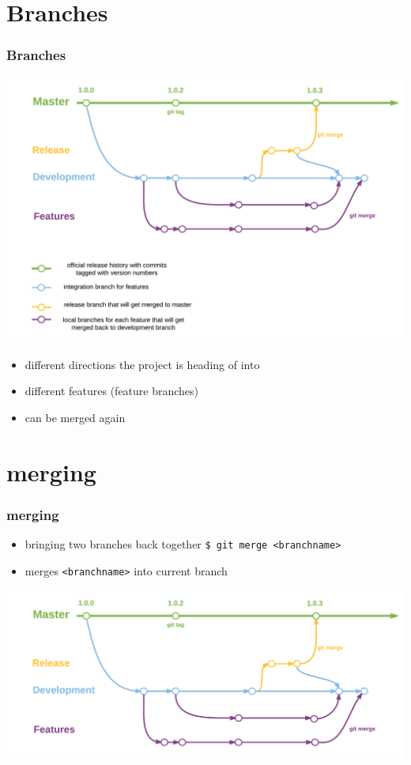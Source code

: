 \documentclass{beamer}
\begin{document}
	\section{Branches}
	\begin{frame}
		\frametitle{Branches}\pause
		\includegraphics[width=.725\linewidth]{gitbranches.png}\pause
		\begin{itemize}
			\item different directions the project is heading of into\pause
			\item different features (feature branches)\pause
			\item can be merged again\newline
		\end{itemize}
	\end{frame}
	
	\section{merging}
	\begin{frame}
		\frametitle{merging}\pause
		\begin{itemize}
			\item bringing two branches back together\newline
			\lstinline|$ git merge <branchname>| \pause\newline
			\item merges \lstinline|<branchname>| into current branch\pause
		\end{itemize}
		\includegraphics[width=.725\linewidth]{gitbranchesslim.png}
	\end{frame}
	
\end{document}
